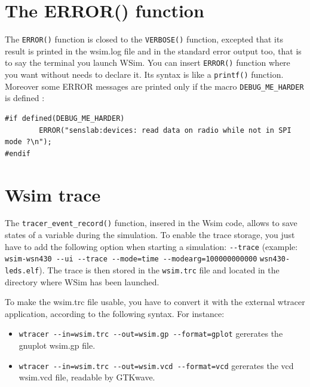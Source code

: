 \documentclass[a4paper,10pt]{report}
\begin{document}
\section{The ERROR() function}
The \verb$ERROR()$ function is closed to the \verb$VERBOSE()$ function, excepted that its result is printed in the wsim.log file and in the standard error output too, that is to say the terminal you launch WSim.
You can insert \verb$ERROR()$ function where you want without needs to declare it. Its syntax is like a \verb$printf()$ function.
Moreover some ERROR messages are printed only if the macro \verb$DEBUG_ME_HARDER$ is defined :
\begin{verbatim}
#if defined(DEBUG_ME_HARDER)
	    ERROR("senslab:devices: read data on radio while not in SPI mode ?\n");
#endif
\end{verbatim}

\section{Wsim trace}
The \verb$tracer_event_record()$ function, insered in the Wsim code, allows to save states of a variable during the simulation. To enable the trace storage, you just have to add the following option when starting a simulation: \verb$--trace$ (example: \verb$wsim-wsn430 --ui --trace --mode=time --modearg=100000000000$ \verb$wsn430-leds.elf$). The trace is then stored in the \verb$wsim.trc$ file and located in the  directory where WSim has been launched.

To make the wsim.trc file usable, you have to convert it with the external wtracer application, according to the following syntax. For instance:
\begin{itemize}
  \item\verb$wtracer --in=wsim.trc --out=wsim.gp --format=gplot$ gererates the gnuplot wsim.gp file. 
  \item\verb$wtracer --in=wsim.trc --out=wsim.vcd --format=vcd$ gererates the vcd wsim.vcd file, readable by GTKwave.
\end{itemize}
\end{document}
